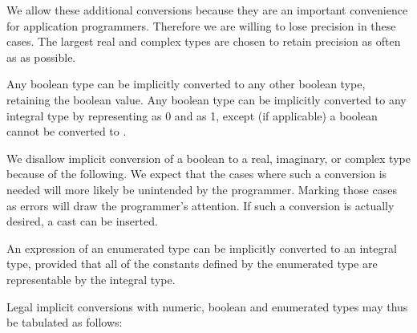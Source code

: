 \begin{rationale}
We allow these additional conversions because they are an important
convenience for application programmers. Therefore we are willing to
lose precision in these cases. The largest real and complex types
are chosen to retain precision as often as as possible.
\end{rationale}

Any boolean type can be implicitly converted to any other boolean type,
retaining the boolean value.
Any boolean type can be implicitly converted to any integral type
by representing  as 0 and  as 1,
except (if applicable)
a boolean cannot be converted to .

\begin{rationale}
We disallow implicit conversion of a boolean to
a real, imaginary, or complex type because of the following.
We expect that the cases where such a conversion is needed
will more likely be unintended by the programmer.
Marking those cases as errors will draw the programmer's attention.
If such a conversion is actually desired, a cast 
can be inserted.
\end{rationale}

An expression of an enumerated type can be implicitly converted
to an integral type, provided that all of the constants defined by the
enumerated type are representable by the integral type.


Legal implicit conversions with numeric, boolean and enumerated types
may thus be tabulated as follows:

